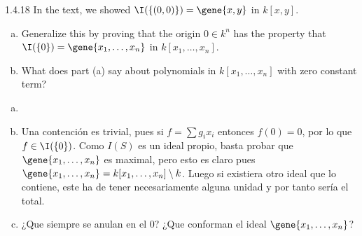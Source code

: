 \documentclass[twoside]{article}
\begin{document}
\newpage
\begin{ejercicio}{1.4.18}
In the text, we showed $\I(\{(0,0)\}) = \gene{x,y}$ in $k[x,y]$. 
\begin{enumerate}[a.]
\item Generalize this by proving that the origin $0\in k^n$ has the property that $\I(\{0\}) = \gene{x_1,\dotsc,x_n}$ in $k[x_1,\dotsc,x_n]$.
\item What does part (a) say about polynomials in $k[x_1,\dotsc,x_n]$ with zero constant term?
\end{enumerate}
\end{ejercicio}
\begin{solucion}
\begin{enumerate}[a.]
\item[]
\item Una contención es trivial, pues si $f= \sum g_i x_i$ entonces  $f(0)=0$, por lo que $f\in \I(\{0\})$. Como $I(S)$ es un ideal propio, basta probar que $\gene{x_1,\dotsc,x_n}$ es maximal, pero esto es claro pues $\gene{x_1,\dotsc,x_n} = k[x_1,\dotsc,x_n]\setminus k$. Luego si existiera otro ideal que lo contiene, este ha de tener necesariamente alguna unidad y por tanto sería el total.
\item ¿Que siempre se anulan en el 0? ¿Que conforman el ideal $\gene{x_1,\dotsc,x_n}$? 

\end{enumerate}
\end{solucion}
\end{document}
